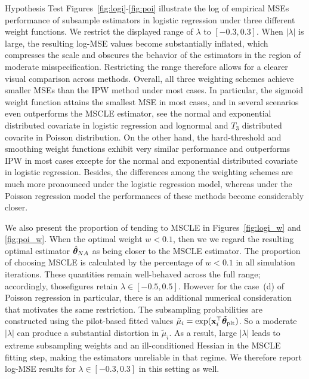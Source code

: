 \documentclass[12pt,hidelinks]{article}
\begin{document}
\begin{section}{Hypothesis Test}
Figures~\ref{fig:logi}-\ref{fig:poi} illustrate the log of empirical MSEs performance of subsample estimators in logistic regression under three different weight functions. 
We restrict the displayed range of $\lambda$ to $[-0.3, 0.3]$. When $|\lambda|$ is large, the resulting log-MSE values become substantially inflated, which compresses the scale and obscures the behavior of the estimators in the region of moderate misspecification. 
Restricting the range therefore allows for a clearer visual comparison 
across methods.
Overall, all three weighting schemes achieve smaller MSEs than the IPW method under most cases. 
In particular, the sigmoid weight function attains the smallest MSE in most cases, and in several scenarios even outperforms the MSCLE estimator, see the normal and exponential distributed covariate in logistic regression and lognormal and $T_3$ distributed covarite in Poisson distribution. 
On the other hand, the hard-threshold and smoothing weight functions exhibit very similar performance and outperforms IPW in most cases excepte for the normal and exponential distributed covariate in logistic regression. 
Besides, the differences among the weighting schemes are much more pronounced under the logistic regression model, whereas under the Poisson regression model the performances of these methods become considerably closer. 

We also present the proportion of tending to MSCLE in Figures~\ref{fig:logi_w} and \ref{fig:poi_w}. When the optimal weight $w < 0.1$, then we we regard the resulting optimal estimator ${\hat{\bm{\theta}}}_{NA}$ as being closer to the MSCLE estimator. The proportion of choosing MSCLE is calculated by the percentage of $w < 0.1$ in all simulation iterations.
These quantities remain well-behaved across the full range; accordingly, thosefigures retain $\lambda \in [-0.5, 0.5]$.
However for the case~(d) of Poisson regression in particular, there is an additional numerical consideration that motivates the same restriction. 
The subsampling probabilities are constructed using the pilot-based fitted values $\tilde{\mu}_i = \exp(\mathbf{x}_i^\top\tilde{\bm{\theta}}_{\mathrm{plt}})$. 
So a moderate $|\lambda|$ can produce a substantial distortion in $\tilde{\mu}_i$. As a result, large $|\lambda|$ leads to extreme subsampling weights and an ill-conditioned Hessian in the MSCLE fitting step, making the estimators unreliable in that regime. We therefore report log-MSE results for $\lambda \in [-0.3, 0.3]$ in this setting as well.


\end{section}
\end{document}
